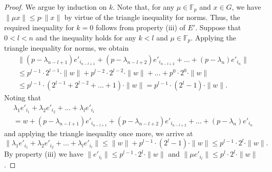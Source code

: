 \documentclass[10pt,a4paper]{amsart}
\begin{document}
\begin{proof}
We argue by induction on $k$. Note that, for any $\mu \in \mathbb F_p$ and $x\in G$, we have $\|\mu x\|\le p\cdot 
\|x\|$ by virtue of the triangle inequality for norms. Thus, the required inequality for $k=0$ follows from property (iii) of $E'$. Suppose that 
$0<l<n$ and the inequality holds for any $k<l$ and $\mu\in \mathbb F_p$. Applying the triangle inequality for 
norms, we obtain 
\begin{multline*}
\|(p-\lambda_{n-l+1})e'_{i_{n-l+1}}+(p-\lambda_{n-l+2})e'_{i_{n-l+2}}+\dots +(p-\lambda_{n})e'_{i_{n}}\| \\
\le p^{l-1}\cdot 2^{l-1}\cdot\|w\|+ p^{l-2}\cdot 2^{l-2}\cdot\|w\|+\dots+p^0\cdot 2^0\cdot\|w\|\\
\le p^{l-1}\cdot (2^{l-1}+2^{l-2}+\dots+1)\cdot\|w\|= p^{l-1}\cdot (2^l-1)\cdot \|w\|. 
\end{multline*}
Noting that 
\begin{multline*}
\lambda_1 e'_{i_{1}}+\lambda_2 e'_{i_{2}}+\dots +\lambda_l e'_{i_{l}}  \\ = w + 
(p-\lambda_{n-l+1})e'_{i_{n-l+1}}+(p-\lambda_{n-l+2})e'_{i_{n-l+2}}+\dots +(p-\lambda_{n})e'_{i_{n}}
\end{multline*}
and 
applying the triangle inequality once more, we arrive at 
$$
\|\lambda_1 e'_{i_{1}}+\lambda_2 e'_{i_{2}}+\dots +\lambda_l e'_{i_{l}}\|\le 
\|w\|+ p^{l-1}\cdot (2^l-1)\cdot \|w\| \le p^{l-1}\cdot 2^l\cdot\|w\|. 
$$
By property (iii) we have $\|e'_{i_{l}}\|\le p^{l-1}\cdot 2^l\cdot\|w\|$ and $\|\mu e'_{i_{l}}\|\le p^l \cdot 
2^l\cdot\|w\|$. 
\end{proof}
\end{document}
